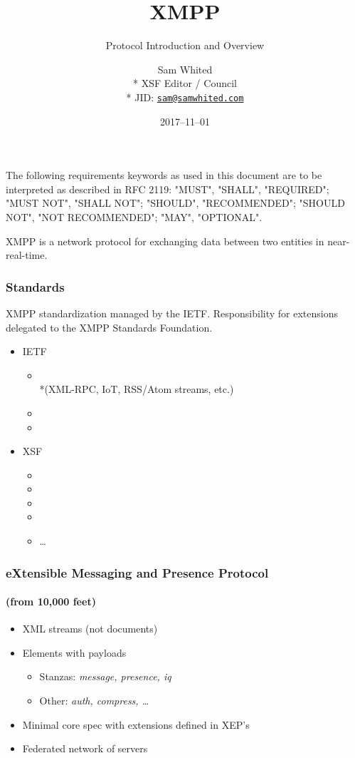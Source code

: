 \documentclass[xelatex,aspectratio=169]{beamer}
\title[]{XMPP}
\subtitle{Protocol Introduction and Overview}
\author[]{%
	Sam Whited\\*%
	{\tiny XSF Editor / Council}\\*%
	{\tiny JID: \texttt{\href{xmpp:sam@samwhited.com}{sam@samwhited.com}}}%
}
\date{2017--11--01}
\begin{document}
\begin{frame}
	\maketitle
\end{frame}

\begin{frame}
	\ttfamily%
	The following requirements keywords as used in this document are to be
	interpreted as described in RFC 2119: "MUST", "SHALL", "REQUIRED"; "MUST NOT",
	"SHALL NOT"; "SHOULD", "RECOMMENDED"; "SHOULD NOT", "NOT RECOMMENDED"; "MAY",
	"OPTIONAL".
\end{frame}

\begin{frame}
	XMPP is a network protocol for exchanging data between two entities in
	near-real-time.
\end{frame}

\begin{frame}
	\frametitle{Standards}
	XMPP standardization managed by the IETF. Responsibility for extensions
	delegated to the XMPP Standards Foundation.

	\begin{itemize}
		\item IETF
		\begin{itemize}
			\item \xmppcore\\*(XML-RPC, IoT, RSS/Atom streams, etc.)
			\item \xmppim
			\item \xmppaddr
		\end{itemize}
	\item XSF
		\begin{itemize}
			\item {}
			\item {}
			\item {}
			\item {}
		\item \ldots
		\end{itemize}
	\end{itemize}
\end{frame}

\begin{frame}
	\frametitle{eXtensible Messaging and Presence Protocol}
	\framesubtitle{(from 10,000 feet)}
	\begin{itemize}
		\item XML streams (not documents)
		\item Elements with payloads
			\begin{itemize}
				\item Stanzas: \textit{message, presence, iq}
				\item Other: \textit{auth, compress, \ldots}
			\end{itemize}
		\item Minimal core spec with extensions defined in XEP's
		\item Federated network of servers
	\end{itemize}
\end{frame}
\end{document}
